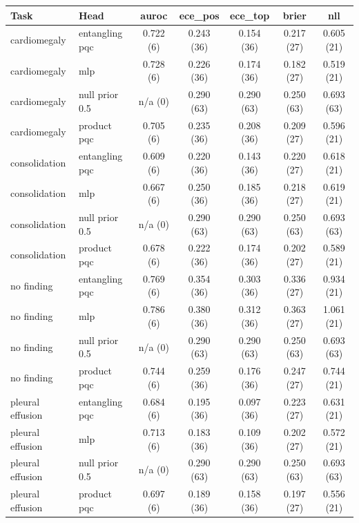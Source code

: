 \begin{tabular}{llccccc}
\toprule
Task & Head & auroc & ece_pos & ece_top & brier & nll \\
\midrule
cardiomegaly & entangling pqc & 0.722 (6) & 0.243 (36) & 0.154 (36) & 0.217 (27) & 0.605 (21) \\
cardiomegaly & mlp & 0.728 (6) & 0.226 (36) & 0.174 (36) & 0.182 (27) & 0.519 (21) \\
cardiomegaly & null prior 0.5 & n/a (0) & 0.290 (63) & 0.290 (63) & 0.250 (63) & 0.693 (63) \\
cardiomegaly & product pqc & 0.705 (6) & 0.235 (36) & 0.208 (36) & 0.209 (27) & 0.596 (21) \\
consolidation & entangling pqc & 0.609 (6) & 0.220 (36) & 0.143 (36) & 0.220 (27) & 0.618 (21) \\
consolidation & mlp & 0.667 (6) & 0.250 (36) & 0.185 (36) & 0.218 (27) & 0.619 (21) \\
consolidation & null prior 0.5 & n/a (0) & 0.290 (63) & 0.290 (63) & 0.250 (63) & 0.693 (63) \\
consolidation & product pqc & 0.678 (6) & 0.222 (36) & 0.174 (36) & 0.202 (27) & 0.589 (21) \\
no finding & entangling pqc & 0.769 (6) & 0.354 (36) & 0.303 (36) & 0.336 (27) & 0.934 (21) \\
no finding & mlp & 0.786 (6) & 0.380 (36) & 0.312 (36) & 0.363 (27) & 1.061 (21) \\
no finding & null prior 0.5 & n/a (0) & 0.290 (63) & 0.290 (63) & 0.250 (63) & 0.693 (63) \\
no finding & product pqc & 0.744 (6) & 0.259 (36) & 0.176 (36) & 0.247 (27) & 0.744 (21) \\
pleural effusion & entangling pqc & 0.684 (6) & 0.195 (36) & 0.097 (36) & 0.223 (27) & 0.631 (21) \\
pleural effusion & mlp & 0.713 (6) & 0.183 (36) & 0.109 (36) & 0.202 (27) & 0.572 (21) \\
pleural effusion & null prior 0.5 & n/a (0) & 0.290 (63) & 0.290 (63) & 0.250 (63) & 0.693 (63) \\
pleural effusion & product pqc & 0.697 (6) & 0.189 (36) & 0.158 (36) & 0.197 (27) & 0.556 (21) \\
\bottomrule
\end{tabular}